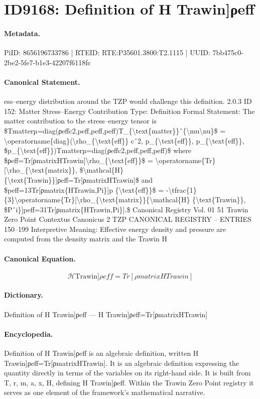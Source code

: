 \section*{ID9168: Definition of H Trawin]ρeff}
\paragraph{Metadata.}
PiID: 8656196733786 | RTEID: RTE:P35601.3800:T2.1115 | UUID: 7bb475c0-2be2-5fe7-b1e3-42207f6118fc

\paragraph{Canonical Statement.}
ess–energy distribution around the TZP would challenge this definition. 2.0.3 ID 152: Matter Stress–Energy Contribution Type: Definition Formal Statement: The matter contribution to the stress–energy tensor is \$Tmatterµ=diag(ρeffc2,peff,peff,peff)T\_\{\textbackslash{}text\{matter\}\}ˆ\{\textbackslash{}mu\textbackslash{}nu\}\$ = \textbackslash{}operatorname\{diag\}(\textbackslash{}rho\_\{\textbackslash{}text\{eff\}\} cˆ2, p\_\{\textbackslash{}text\{eff\}\}, p\_\{\textbackslash{}text\{eff\}\}, \$p\_\{\textbackslash{}text\{eff\}\})Tmatterµ=diag(ρeffc2,peff,peff,peff)\$ where \$ρeff=Tr[ρmatrixHTrawin]\textbackslash{}rho\_\{\textbackslash{}text\{eff\}\}\$ = \textbackslash{}operatorname\{Tr\}[\textbackslash{}rho\_\{\textbackslash{}text\{matrix\}\}, \$\textbackslash{}mathcal\{H\} \{\textbackslash{}text\{Trawin\}\}]ρeff=Tr[ρmatrixHTrawin]\$ and \$peff=13Tr[ρmatrix\{HTrawin,Pi\}]p \{\textbackslash{}text\{eff\}\}\$ = -\textbackslash{}tfrac\{1\}\{3\}\textbackslash{}operatorname\{Tr\}[\textbackslash{}rho\_\{\textbackslash{}text\{matrix\}\}\{\textbackslash{}mathcal\{H\} \{\textbackslash{}text\{Trawin\}\}, \$Pˆi\}]peff=31Tr[ρmatrix\{HTrawin,Pi\}].\$ Canonical Registry Vol. 01 51 Trawin Zero Point Contextus Canonicus 2 TZP CANONICAL REGISTRY – ENTRIES 150–199 Interpretive Meaning: Effective energy density and pressure are computed from the density matrix and the Trawin H

\paragraph{Canonical Equation.}
\[
\mathcal{H} {\text{Trawin}}]ρeff=Tr[ρmatrixHTrawin]
\]

\paragraph{Dictionary.}
Definition of H Trawin]ρeff — H Trawin]ρeff=Tr[ρmatrixHTrawin]

\paragraph{Encyclopedia.}
Definition of H Trawin]ρeff is an algebraic definition, written H Trawin]ρeff=Tr[ρmatrixHTrawin]. It is an algebraic definition expressing the quantity directly in terms of the variables on its right-hand side. It is built from T, r, m, a, x, H, defining H Trawin]ρeff. Within the Trawin Zero Point registry it serves as one element of the framework's mathematical narrative.
